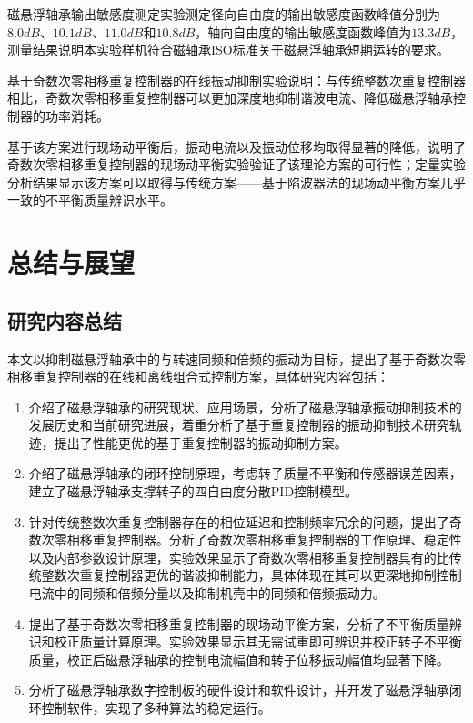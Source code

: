 \documentclass[
  lang=cn,
  degree=master,
  openany,oneside
]{nuaathesis}
\begin{document}
磁悬浮轴承输出敏感度测定实验测定径向自由度的输出敏感度函数峰值分别为$8.0dB$、$10.1dB$、$11.0dB$和$10.8dB$，轴向自由度的输出敏感度函数峰值为$13.3dB$，测量结果说明本实验样机符合磁轴承ISO标准关于磁悬浮轴承短期运转的要求。

基于奇数次零相移重复控制器的在线振动抑制实验说明：与传统整数次重复控制器相比，奇数次零相移重复控制器可以更加深度地抑制谐波电流、降低磁悬浮轴承控制器的功率消耗。

基于该方案进行现场动平衡后，振动电流以及振动位移均取得显著的降低，说明了奇数次零相移重复控制器的现场动平衡实验验证了该理论方案的可行性；定量实验分析结果显示该方案可以取得与传统方案——基于陷波器法的现场动平衡方案几乎一致的不平衡质量辨识水平。

\chapter{总结与展望}

\section{研究内容总结}

本文以抑制磁悬浮轴承中的与转速同频和倍频的振动为目标，提出了基于奇数次零相移重复控制器的在线和离线组合式控制方案，具体研究内容包括：
\begin{enumerate}
	\item 介绍了磁悬浮轴承的研究现状、应用场景，分析了磁悬浮轴承振动抑制技术的发展历史和当前研究进展，着重分析了基于重复控制器的振动抑制技术研究轨迹，提出了性能更优的基于重复控制器的振动抑制方案。
	\item 介绍了磁悬浮轴承的闭环控制原理，考虑转子质量不平衡和传感器误差因素，建立了磁悬浮轴承支撑转子的四自由度分散PID控制模型。
	\item 针对传统整数次重复控制器存在的相位延迟和控制频率冗余的问题，提出了奇数次零相移重复控制器。分析了奇数次零相移重复控制器的工作原理、稳定性以及内部参数设计原理，实验效果显示了奇数次零相移重复控制器具有的比传统整数次重复控制器更优的谐波抑制能力，具体体现在其可以更深地抑制控制电流中的同频和倍频分量以及抑制机壳中的同频和倍频振动力。
	\item 提出了基于奇数次零相移重复控制器的现场动平衡方案，分析了不平衡质量辨识和校正质量计算原理。实验效果显示其无需试重即可辨识并校正转子不平衡质量，校正后磁悬浮轴承的控制电流幅值和转子位移振动幅值均显著下降。
	\item 分析了磁悬浮轴承数字控制板的硬件设计和软件设计，并开发了磁悬浮轴承闭环控制软件，实现了多种算法的稳定运行。
\end{enumerate}
\end{document}
